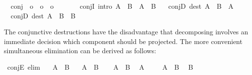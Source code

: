 \begin{isabellebody}
\isanewline
{}\isamarkupfalse%
\isanewline
\ \ conj\ {\isacharcolon}{\isacharcolon}\ {\isachardoublequoteopen}o\ {\isasymRightarrow}\ o\ {\isasymRightarrow}\ o{\isachardoublequoteclose}\ \ {\isacharparenleft}\ {\isachardoublequoteopen}{\isasymand}{\isachardoublequoteclose}\ {}{}{\isacharparenright}\ \isanewline
\ \ conjI\ {\isacharbrackleft}intro{\isacharbrackright}{\isacharcolon}\ {\isachardoublequoteopen}A\ {\isasymLongrightarrow}\ B\ {\isasymLongrightarrow}\ A\ {\isasymand}\ B{\isachardoublequoteclose}\ \isanewline
\ \ conjD\ {\isacharbrackleft}dest{\isacharbrackright}{\isacharcolon}\ {\isachardoublequoteopen}A\ {\isasymand}\ B\ {\isasymLongrightarrow}\ A{\isachardoublequoteclose}\ \isanewline
\ \ conjD\ {\isacharbrackleft}dest{\isacharbrackright}{\isacharcolon}\ {\isachardoublequoteopen}A\ {\isasymand}\ B\ {\isasymLongrightarrow}\ B{\isachardoublequoteclose}%
\begin{isamarkuptext}%
\noindent The conjunctive destructions have the disadvantage that
  decomposing  involves an immediate decision which
  component should be projected.  The more convenient simultaneous
  elimination  can be derived as
  follows:%
\end{isamarkuptext}%
\isamarkuptrue%
\isamarkupfalse%
\ conjE\ {\isacharbrackleft}elim{\isacharbrackright}{\isacharcolon}\isanewline
\ \ \ {\isachardoublequoteopen}A\ {\isasymand}\ B{\isachardoublequoteclose}\isanewline
\ \ \ A\ \ B\isanewline
%
\isadelimproof
%
\endisadelimproof
%
\isatagproof
{}\isamarkupfalse%
\isanewline
\ \ \isamarkupfalse%
\ {\isacharbackquoteopen}A\ {\isasymand}\ B{\isacharbackquoteclose}\ \isamarkupfalse%
\ A\ \isacommand{{\isachardot}{\isachardot}}\isamarkupfalse%
\isanewline
\ \ \isamarkupfalse%
\ {\isacharbackquoteopen}A\ {\isasymand}\ B{\isacharbackquoteclose}\ \isamarkupfalse%
\ B\ \isacommand{{\isachardot}{\isachardot}}\isamarkupfalse%
\isanewline
{}\isamarkupfalse%
%
\endisatagproof
{\isafoldproof}%
%
\isadelimproof
%
\endisadelimproof

\end{isabellebody}
